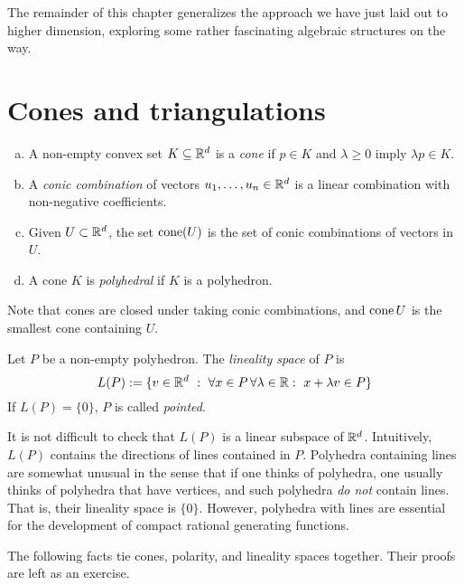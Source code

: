 The remainder of this chapter generalizes the approach we have just laid out to higher dimension,
exploring some rather fascinating algebraic structures on the way.



\section{Cones and triangulations}

\begin{definition}
  \begin{enumerate}[(a)]
    \item A non-empty convex set $K \subseteq \mathbb{R}^d$ is a \emph{cone}
      if $p \in K$ and $\lambda \geq 0$ imply $\lambda p \in K$.

    \item A \emph{conic combination} of vectors $u_1, \ldots, u_n \in \mathbb{R}^d$ is
      a linear combination with non-negative coefficients.

    \item Given $U \subset \mathbb{R}^d$, the set $\operatorname{cone}(U)$ is the set of conic combinations of vectors in $U$.

    \item A cone $K$ is \emph{polyhedral} if $K$ is a polyhedron.
  \end{enumerate}
\end{definition}

Note that cones are closed under taking conic combinations,
and $\operatorname{cone}{U}$ is the smallest cone containing $U$.

\begin{definition}
  Let $P$ be a non-empty polyhedron.
  The \emph{lineality space} of $P$ is
  \[
    L(P) := \{ v \in \mathbb{R}^d ~:~ \forall x\in P \,\forall \lambda \in \mathbb{R}:~ x + \lambda v \in P  \}
  \]
  If $L(P) = \{ 0 \}$, $P$ is called \emph{pointed}.
\end{definition}

It is not difficult to check that $L(P)$ is a linear subspace of $\mathbb{R}^d$.
Intuitively, $L(P)$ contains the directions of lines contained in $P$.
Polyhedra containing lines are somewhat unusual in the sense
that if one thinks of polyhedra, one usually thinks of polyhedra that have vertices,
and such polyhedra \emph{do not} contain lines.
That is, their lineality space is $\{ 0 \}$.
However, polyhedra with lines are essential for the development of compact rational generating functions.

The following facts tie cones, polarity, and lineality spaces together.
Their proofs are left as an exercise.

